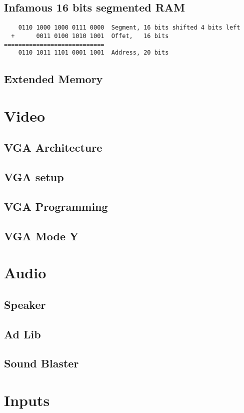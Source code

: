 \documentclass[book.tex]{subfiles}
\begin{document}
  \subsection{Infamous 16 bits segmented RAM}

\begin{verbatim}
    0110 1000 1000 0111 0000  Segment, 16 bits shifted 4 bits left  
  +      0011 0100 1010 1001  Offet,   16 bits
============================
    0110 1011 1101 0001 1001  Address, 20 bits
\end{verbatim}

  \subsection{Extended Memory}
  
\section{Video}
  \subsection{VGA Architecture}
  \subsection{VGA setup}
  \subsection{VGA Programming}
  \subsection{VGA Mode Y}
\section{Audio}
  \subsection{Speaker}
  \subsection{Ad Lib}
  \subsection{Sound Blaster}

\section{Inputs}
\end{document}
